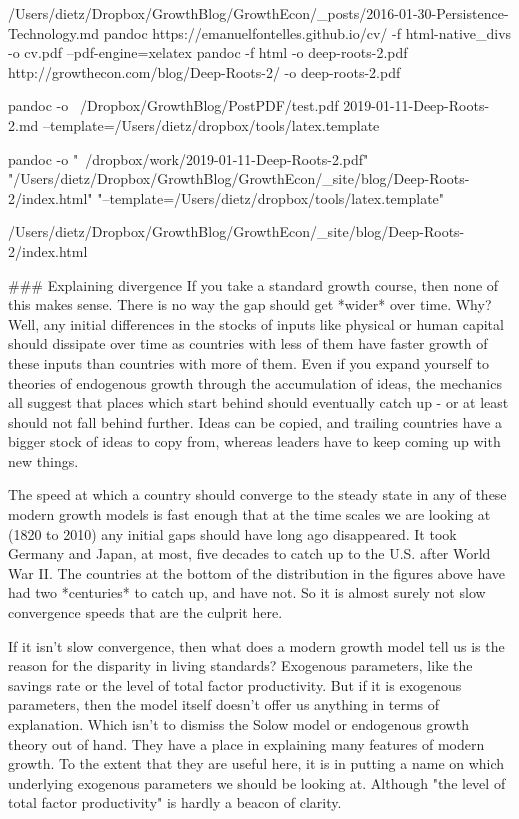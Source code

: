 /Users/dietz/Dropbox/GrowthBlog/GrowthEcon/_posts/2016-01-30-Persistence-Technology.md
pandoc https://emanuelfontelles.github.io/cv/ -f html-native_divs -o cv.pdf --pdf-engine=xelatex
pandoc -f html -o deep-roots-2.pdf http://growthecon.com/blog/Deep-Roots-2/ -o deep-roots-2.pdf

pandoc -o ~/Dropbox/GrowthBlog/PostPDF/test.pdf 2019-01-11-Deep-Roots-2.md --template=/Users/dietz/dropbox/tools/latex.template

pandoc -o "~/dropbox/work/2019-01-11-Deep-Roots-2.pdf" "/Users/dietz/Dropbox/GrowthBlog/GrowthEcon/_site/blog/Deep-Roots-2/index.html" "--template=/Users/dietz/dropbox/tools/latex.template"

/Users/dietz/Dropbox/GrowthBlog/GrowthEcon/_site/blog/Deep-Roots-2/index.html

### Explaining divergence
If you take a standard growth course, then none of this makes sense. There is no way the gap should get *wider* over time. Why? Well, any initial differences in the stocks of inputs like physical or human capital should dissipate over time as countries with less of them have faster growth of these inputs than countries with more of them. Even if you expand yourself to theories of endogenous growth through the accumulation of ideas, the mechanics all suggest that places which start behind should eventually catch up - or at least should not fall behind further. Ideas can be copied, and trailing countries have a bigger stock of ideas to copy from, whereas leaders have to keep coming up with new things. 

The speed at which a country should converge to the steady state in any of these modern growth models is fast enough that at the time scales we are looking at (1820 to 2010) any initial gaps should have long ago disappeared. It took Germany and Japan, at most, five decades to catch up to the U.S. after World War II. The countries at the bottom of the distribution in the figures above have had two *centuries* to catch up, and have not. So it is almost surely not slow convergence speeds that are the culprit here.

If it isn't slow convergence, then what does a modern growth model tell us is the reason for the disparity in living standards? Exogenous parameters, like the savings rate or the level of total factor productivity. But if it is exogenous parameters, then the model itself doesn't offer us anything in terms of explanation. Which isn't to dismiss the Solow model or endogenous growth theory out of hand. They have a place in explaining many features of modern growth. To the extent that they are useful here, it is in putting a name on which underlying exogenous parameters we should be looking at. Although "the level of total factor productivity" is hardly a beacon of clarity. 

